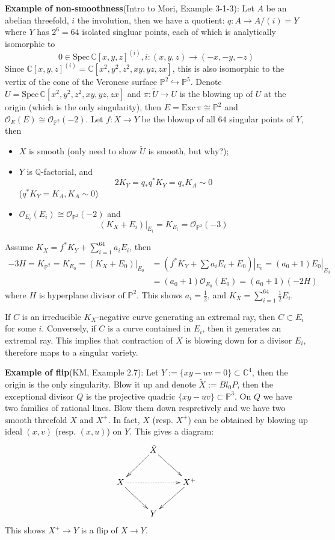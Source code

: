 \documentclass{article}
\begin{document}
\textbf{Example of non-smoothness}(Intro to Mori, Example 3-1-3): Let $ A $ be an abelian threefold, $ i $ the involution, then we have a quotient: $ q:A\to A/(i)=Y $ where $ Y $ has $ 2^6=64 $ isolated singluar points, each of which is analytically isomorphic to 
\[ 0\in \mathrm{Spec}\,\mathbb{C}[x,y,z]^{(i)}, i:(x,y,z)\to (-x,-y,-z) \]
Since $ \mathbb{C}[x,y,z]^{(i)}=\mathbb{C}[x^2,y^2,z^2,xy,yz,zx] $, this is also isomorphic to the vertix of the cone of the Veronese surface $ \mathbb{P}^2 \hookrightarrow \mathbb{P}^5$. Denote $ U=\mathrm{Spec}\,\mathbb{C}[x^2,y^2,z^2,xy,yz,zx] $ and $ \pi:\tilde{U}\to U $ is the blowing up of $ U $ at the origin (which is the only singularity), then $ E=\mathrm{Exc}\,\pi\cong \mathbb{P}^2 $ and $ \mathcal{O}_E(E)\cong \mathcal{O}_{\mathbb{P}^2}(-2) $. Let $ f:X\to Y $ be the blowup of all $ 64 $ singular points of $ Y $, then
\begin{itemize}
  \item $ X $ is smooth (only need to show $ \tilde{U} $ is smooth, but why?);
  \item $ Y $ is $ \mathbb{Q} $-factorial, and 
  \[ 2K_Y=q_*q^*K_Y=q_*K_A\sim 0\]
  ($ q^*K_Y=K_A,K_A\sim 0 $)
  \item $ \mathcal{O}_{E_i}(E_i)\cong \mathcal{O}_{\mathbb{P}^2}(-2) $ and
    \[
      (K_X+E_i)|_{E_i}=K_{E_i}=\mathcal{O}_{\mathbb{P}^2}(-3)
    \]
\end{itemize}
Assume $ K_X=f^*K_Y+\sum_{i=1}^{64}a_iE_i $, then 
\begin{equation*}
\begin{aligned}
-3H=K_{\mathbb{P}^2}=K_{E_0}=(K_X+E_0)|_{E_0}&=(f^*K_Y+\sum a_iE_i+E_0)|_{E_0}=(a_0+1)E_0|_{E_0}\\
&=(a_0+1)\mathcal{O}_{E_0}(E_0)=(a_0+1)(-2H)
\end{aligned}
\end{equation*}
 where $ H $ is hyperplane divisor of $ \mathbb{P}^2 $. This shows $ a_i =\frac{1}{2}$, and $ K_X=\sum_{i=1}^{64}\frac{1}{2}E_i $. 
 
If $ C $ is an irreducible $ K_X $-negative curve generating an extremal ray, then $ C\subset E_i $ for some $ i $. Conversely, if $ C $ is a curve contained in $ E_i $, then it generates an extremal ray. This implies that contraction of $ X $ is blowing down for a divisor $ E_i $, therefore maps to a singular variety.



\textbf{Example of flip}(KM, Example 2.7): Let $ Y:=\{ xy-uv=0 \}\subset \mathbb{C}^4 $, then the origin is the only singularity. Blow it up and denote $ \tilde{X}:=Bl_0P $, then the exceptional divisor $ Q $ is the projective quadric $ \{ xy-uv \}\subset \mathbb{P}^3 $. On $ Q $ we have two families of rational lines. Blow them down resprctively and we have two smooth threefold $ X $ and $ X^+ $. In fact, $ X $ (resp. $ X^+ $) can be obtained by blowing up ideal $ (x,v) $ (resp. $ (x,u) $) on $ Y $. This gives a diagram:
$$ \xymatrix{
  &\tilde{X}\ar[ld]\ar[rd]&\\
  X\ar[rd]\ar@{.>}[rr]&&X^+\ar[ld]\\
  &Y&
} $$ 
This shows $ X^+\to Y $ is a flip of $ X\to Y $.
\end{document}
